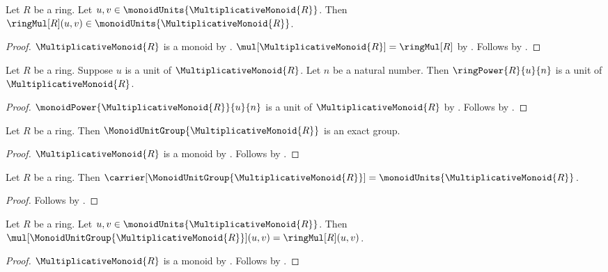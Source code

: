 \begin{theorem}\label{ring_units_closed_under_multiplication}
    Let $R$ be a ring.
    Let $u,v\in\monoidUnits{\MultiplicativeMonoid{R}}$.
    Then $\ringMul[R](u,v)\in
        \monoidUnits{\MultiplicativeMonoid{R}}$.
\end{theorem}
\begin{proof}
    $\MultiplicativeMonoid{R}$ is a monoid by
        .
    $\mul[\MultiplicativeMonoid{R}]=\ringMul[R]$ by
        .
    Follows by .
\end{proof}

\begin{theorem}\label{ring_unit_power}
    Let $R$ be a ring.
    Suppose $u$ is a unit of $\MultiplicativeMonoid{R}$.
    Let $n$ be a natural number.
    Then $\ringPower{R}{u}{n}$ is a unit of
        $\MultiplicativeMonoid{R}$.
\end{theorem}
\begin{proof}
    $\monoidPower{\MultiplicativeMonoid{R}}{u}{n}$ is a unit of
        $\MultiplicativeMonoid{R}$ by .
    Follows by .
\end{proof}

\begin{theorem}\label{ring_unit_group_is_exact_group}
    Let $R$ be a ring.
    Then $\MonoidUnitGroup{\MultiplicativeMonoid{R}}$
        is an exact group.
\end{theorem}
\begin{proof}
    $\MultiplicativeMonoid{R}$ is a monoid by
        .
    Follows by .
\end{proof}

\begin{proposition}\label{ring_unit_group_carrier}
    Let $R$ be a ring.
    Then
        $\carrier[\MonoidUnitGroup{\MultiplicativeMonoid{R}}]
            =\monoidUnits{\MultiplicativeMonoid{R}}$.
\end{proposition}
\begin{proof}
    Follows by .
\end{proof}

\begin{proposition}\label{ring_unit_group_mul_apply}
    Let $R$ be a ring.
    Let $u,v\in\monoidUnits{\MultiplicativeMonoid{R}}$.
    Then
        $\mul[\MonoidUnitGroup{\MultiplicativeMonoid{R}}](u,v)
            =\ringMul[R](u,v)$.
\end{proposition}
\begin{proof}
    $\MultiplicativeMonoid{R}$ is a monoid by
        .
    Follows by
        .
\end{proof}
